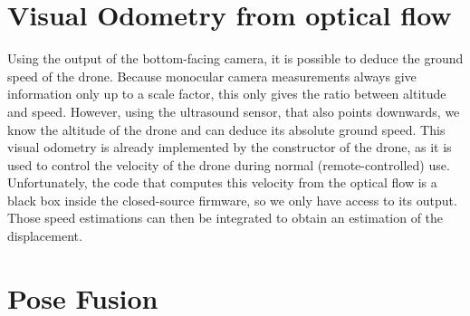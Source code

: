\section{Visual Odometry from optical flow}
Using the output of the bottom-facing camera, it is possible to deduce the ground speed of the drone. Because monocular camera measurements always give information only up to a scale factor, this only gives the ratio between altitude and speed. However, using the ultrasound sensor, that also points downwards, we know the altitude of the drone and can deduce its absolute ground speed. This visual odometry is already implemented by the constructor of the drone, as it is used to control the velocity of the drone during normal (remote-controlled) use. Unfortunately, the code that computes this velocity from the optical flow is a black box inside the closed-source firmware, so we only have access to its output. Those speed estimations can then be integrated to obtain an estimation of the displacement.\\


\section{Pose Fusion}\label{sec:posefusion}
